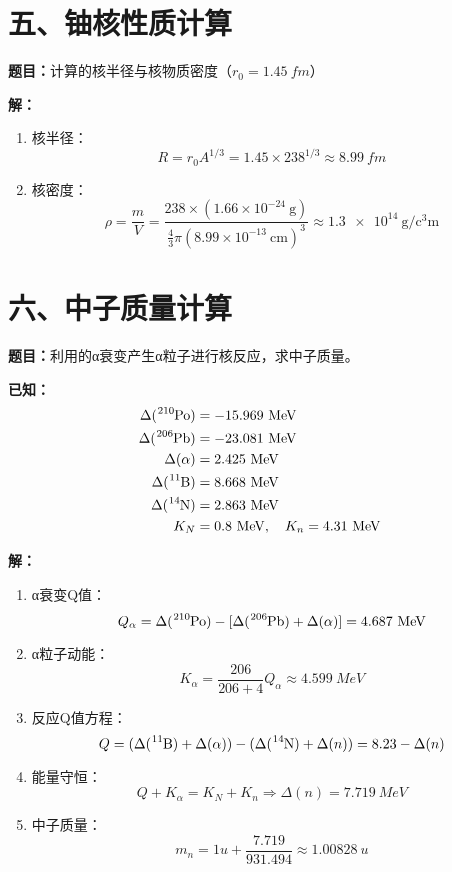 \documentclass{article}
\begin{document}
\section*{五、铀核性质计算}
\textbf{题目：}计算的核半径与核物质密度（$r_0=1.45\ \si{fm}$）

\textbf{解：}
\begin{enumerate}
  \item 核半径：
  $$
  R = r_0 A^{1/3} = 1.45 \times 238^{1/3} \approx \SI{8.99}{fm}
  $$
  
  \item 核密度：
  $$
  \rho = \frac{m}{V} = \frac{238 \times (1.66 \times 10^{-24}\ \si{\gram})}{\frac{4}{3}\pi \left(8.99 \times 10^{-13}\ \si{\centi\meter}\right)^3} \approx \SI{1.3e14}{\gram\per\cubic\centi\meter}
  $$
\end{enumerate}

\section*{六、中子质量计算}
\textbf{题目：}利用的α衰变产生α粒子进行核反应，求中子质量。

\textbf{已知：}
$$
\begin{aligned}
\Delta(\ce{^{210}Po}) &= -15.969\ \si{MeV} \\
\Delta(\ce{^{206}Pb}) &= -23.081\ \si{MeV} \\
\Delta(\alpha) &= 2.425\ \si{MeV} \\
\Delta(\ce{^{11}B}) &= 8.668\ \si{MeV} \\
\Delta(\ce{^{14}N}) &= 2.863\ \si{MeV} \\
K_N &= 0.8\ \si{MeV},\quad K_n = 4.31\ \si{MeV}
\end{aligned}
$$

\textbf{解：}
\begin{enumerate}
  \item α衰变Q值：
  $$
  Q_\alpha = \Delta(\ce{^{210}Po}) - [\Delta(\ce{^{206}Pb}) + \Delta(\alpha)] = 4.687\ \si{MeV}
  $$
  
  \item α粒子动能：
  $$
  K_\alpha = \frac{206}{206+4}Q_\alpha \approx \SI{4.599}{MeV}
  $$
  
  \item 反应Q值方程：
  $$
  Q = (\Delta(\ce{^{11}B}) + \Delta(\alpha)) - (\Delta(\ce{^{14}N}) + \Delta(n)) = 8.23 - \Delta(n)
  $$
  
  \item 能量守恒：
  $$
  Q + K_\alpha = K_N + K_n \Rightarrow \Delta(n) = \SI{7.719}{MeV}
  $$
  
  \item 中子质量：
  $$
  m_n = 1u + \frac{7.719}{931.494} \approx \SI{1.00828}{u}
  $$
\end{enumerate}
\end{document}
